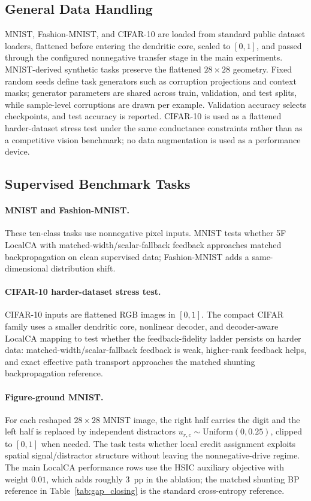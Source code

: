     \subsection{General Data Handling}
    
    MNIST, Fashion-MNIST, and CIFAR-10 are loaded from standard public dataset loaders, flattened before entering the dendritic core, scaled to $[0,1]$, and passed through the configured nonnegative transfer stage in the main experiments. MNIST-derived synthetic tasks preserve the flattened $28\times28$ geometry. Fixed random seeds define task generators such as corruption projections and context masks; generator parameters are shared across train, validation, and test splits, while sample-level corruptions are drawn per example. Validation accuracy selects checkpoints, and test accuracy is reported. CIFAR-10 is used as a flattened harder-dataset stress test under the same conductance constraints rather than as a competitive vision benchmark; no data augmentation is used as a performance device.
    
    \subsection{Supervised Benchmark Tasks}
    
    \paragraph{MNIST and Fashion-MNIST.}
    These ten-class tasks use nonnegative pixel inputs. MNIST tests whether 5F LocalCA with matched-width/scalar-fallback feedback approaches matched backpropagation on clean supervised data; Fashion-MNIST adds a same-dimensional distribution shift.
    
    \paragraph{CIFAR-10 harder-dataset stress test.}
    CIFAR-10 inputs are flattened RGB images in $[0,1]$. The compact CIFAR family uses a smaller dendritic core, nonlinear decoder, and decoder-aware LocalCA mapping to test whether the feedback-fidelity ladder persists on harder data: matched-width/scalar-fallback feedback is weak, higher-rank feedback helps, and exact effective path transport approaches the matched shunting backpropagation reference.
    
    \paragraph{Figure-ground MNIST.}
    For each reshaped $28\times28$ MNIST image, the right half carries the digit and the left half is replaced by independent distractors $u_{r,c}\sim\mathrm{Uniform}(0,0.25)$, clipped to $[0,1]$ when needed. The task tests whether local credit assignment exploits spatial signal/distractor structure without leaving the nonnegative-drive regime. The main LocalCA performance rows use the HSIC auxiliary objective with weight $0.01$, which adds roughly $3$~pp in the ablation; the matched shunting BP reference in Table~\ref{tab:gap_closing} is the standard cross-entropy reference.
    
